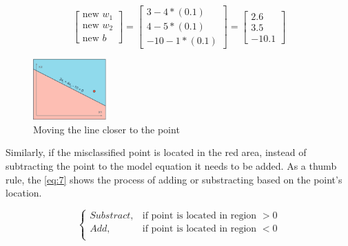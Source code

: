 \documentclass{article}
\begin{document}
\[
\begin{bmatrix}  \text{new } w_1 \\
                 \text{new } w_2 \\
                \text{new } b \end{bmatrix} = \begin{bmatrix}
                                    3 - 4*(0.1) \\
                                    4 - 5*(0.1) \\
                                    -10 - 1*(0.1)
                                    \end{bmatrix} = \begin{bmatrix}
                                                    2.6 \\
                                                    3.5 \\
                                                    -10.1
                                                    \end{bmatrix}
\]

\begin{figure}[ht]
    \centering
    \includegraphics[width=0.25\textwidth,height=0.25\textheight,keepaspectratio]{images/new_line.png}
    \captionsetup{justification=centering}
    \caption{Moving the line closer to the point}
    \label{fig:f15}
\end{figure}

Similarly, if the misclassified point is located in the red area, instead of subtracting the point to the model equation it needs to be added. As a thumb rule, the \eqref{eq:7} shows the process of adding or substracting based on the point's location.

\begin{equation}
\label{eq:7}
  \begin{cases}
    Substract, & \text{if } \text{point is located in region } > 0 \\
    Add, & \text{if } \text{point is located in region } < 0 \\
  \end{cases}
\end{equation}  
\end{document}
